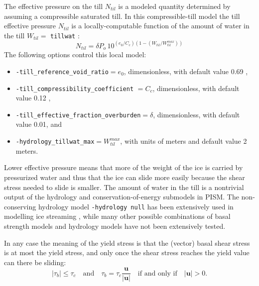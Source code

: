 The effective pressure on the till $N_{til}$ is a modeled quantity determined by assuming a compressible saturated till.  In this compressible-till model the till effective pressure $N_{til}$ is a locally-computable function of the amount of water in the till $W_{til} =$ \texttt{tillwat} \cite{BuelervanPeltDRAFT}:
\begin{equation}
N_{til} = \delta P_o \, 10^{(e_0/C_c) \left(1 - (W_{til}/W_{til}^{max})\right)}  \label{eq:computeNtil}
\end{equation}
The following options control this local model:\begin{itemize}
\item \texttt{-till_reference_void_ratio}$= e_0$, dimensionless, with default value 0.69 \cite{Tulaczyketal2000b},
\item \texttt{-till_compressibility_coefficient} $= C_c$, dimensionless, with default value 0.12 \cite{Tulaczyketal2000b},
\item \texttt{-till_effective_fraction_overburden}$= \delta$, dimensionless, with default value 0.01, and
\item \texttt{-hydrology_tillwat_max}$= W_{til}^{max}$, with units of meters and default value 2 meters.
\end{itemize}

Lower effective pressure means that more of the weight of the ice is carried by pressurized water and thus that the ice can slide more easily because the shear stress needed to slide is smaller.  The amount of water in the till is a nontrivial output of the hydrology and conservation-of-energy submodels in PISM.  The non-conserving hydrology model \texttt{-hydrology null} has been extensively used in modelling ice streaming \cite{BBssasliding,BKAJS,Winkelmannetal2011}, while many other possible combinations of basal strength models and hydrology models have not been extensively tested.

In any case the meaning of the yield stress is that the (vector) basal shear stress is at most the yield stress, and only once the shear stress reaches the yield value can there be sliding:
\begin{equation*}
   |\tau_b| \le \tau_c \quad \text{and} \quad \tau_b = \tau_c \frac{\mathbf{u}}{|\mathbf{u}|} \quad\text{if and only if}\quad |\mathbf{u}| > 0.
\end{equation*}

